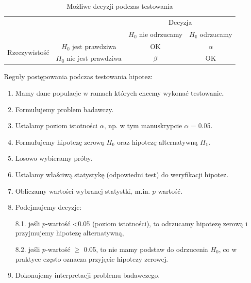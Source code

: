 \documentclass[12pt,B5paper,]{book}
\begin{document}
\begin{table}[H]
\centering
\caption{Możliwe decyzji podczas testowania}
\label{decyzje}
\begin{tabular}{cc|c|c|}
\cline{3-4}
\multicolumn{2}{c}{\multirow{2}{*}{}}                                       & \multicolumn{2}{|c|}{Decyzja} \\ \cline{3-4} 
\multicolumn{2}{c|}{}                                                        & $H_0$ nie odrzucamy  & $H_0$ odrzucamy \\ \hline
\multicolumn{1}{|c|}{\multirow{2}{*}{Rzeczywistość}} & $H_0$ jest prawdziwa          & OK             & $\alpha$          \\ \cline{2-4} 
\multicolumn{1}{|c|}{}                               & $H_0$ nie jest prawdziwa & $\beta$              & OK          \\ \hline
\end{tabular}
\end{table}

Reguły postępowania podczas testowania hipotez:

\begin{enumerate}
\def\labelenumi{\arabic{enumi}.}
\item
  Mamy dane populacje w ramach których chcemy wykonać testowanie.
\item
  Formułujemy problem badawczy.
\item
  Ustalamy poziom istotności \(\alpha\), np. w tym manuskrypcie
  \(\alpha\) = 0.05.
\item
  Formułujemy hipotezę zerową \(H_0\) oraz hipotezę alternatywną
  \(H_1\).
\item
  Losowo wybieramy próby.
\item
  Ustalamy właściwą statystykę (odpowiedni test) do weryfikacji hipotez.
\item
  Obliczamy wartości wybranej statystki, m.in. \(p\)-wartość.
\item
  Podejmujemy decyzje:

  8.1. jeśli \(p\)-wartość \textless{}0.05 (poziom istotności), to
  odrzucamy hipotezę zerową i przyjmujemy hipotezę alternatywną,

  8.2. jeśli \(p\)-wartość \(\geq\) 0.05, to nie mamy podstaw do
  odrzucenia \(H_0\), co w praktyce często oznacza przyjęcie hipotezy
  zerowej.
\item
  Dokonujemy interpretacji problemu badawczego.
\end{enumerate}
\end{document}
